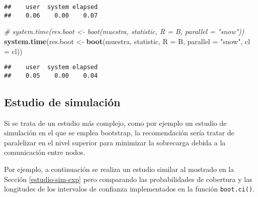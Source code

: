 \documentclass[]{book}
\newenvironment{Shaded}{\begin{snugshade}}{\end{snugshade}}
\newcommand{\KeywordTok}[1]{\textcolor[rgb]{0.13,0.29,0.53}{\textbf{#1}}}
\newcommand{\DataTypeTok}[1]{\textcolor[rgb]{0.13,0.29,0.53}{#1}}
\newcommand{\StringTok}[1]{\textcolor[rgb]{0.31,0.60,0.02}{#1}}
\newcommand{\CommentTok}[1]{\textcolor[rgb]{0.56,0.35,0.01}{\textit{#1}}}
\newcommand{\NormalTok}[1]{#1}
\theoremstyle{break}
\theoremstyle{definition}
\theoremstyle{definition}
\theoremstyle{definition}
\theoremstyle{remark}
\begin{document}
\begin{verbatim}
##    user  system elapsed 
##    0.06    0.00    0.07
\end{verbatim}

\begin{Shaded}
\begin{Highlighting}[]
\CommentTok{# system.time(res.boot <- boot(muestra, statistic, R = B, parallel = "snow"))}
\KeywordTok{system.time}\NormalTok{(res.boot <-}\StringTok{ }\KeywordTok{boot}\NormalTok{(muestra, statistic, }\DataTypeTok{R =}\NormalTok{ B, }\DataTypeTok{parallel =} \StringTok{"snow"}\NormalTok{, }\DataTypeTok{cl =}\NormalTok{ cl))}
\end{Highlighting}
\end{Shaded}

\begin{verbatim}
##    user  system elapsed 
##    0.05    0.00    0.04
\end{verbatim}

\subsection{Estudio de simulación}\label{estudio-sim-boot}

Si se trata de un estudio más complejo, como por ejemplo un estudio de
simulación en el que se emplea bootstrap, la recomendación sería tratar
de paralelizar en el nivel superior para minimizar la sobrecarga debida
a la comunicación entre nodos.

Por ejemplo, a continuación se realiza un estudio similar al mostrado en
la Sección \ref{estudio-sim-exp} pero comparando las probabilidades de
cobertura y las longitudes de los intervalos de confianza implementados
en la función \texttt{boot.ci()}.
\end{document}
